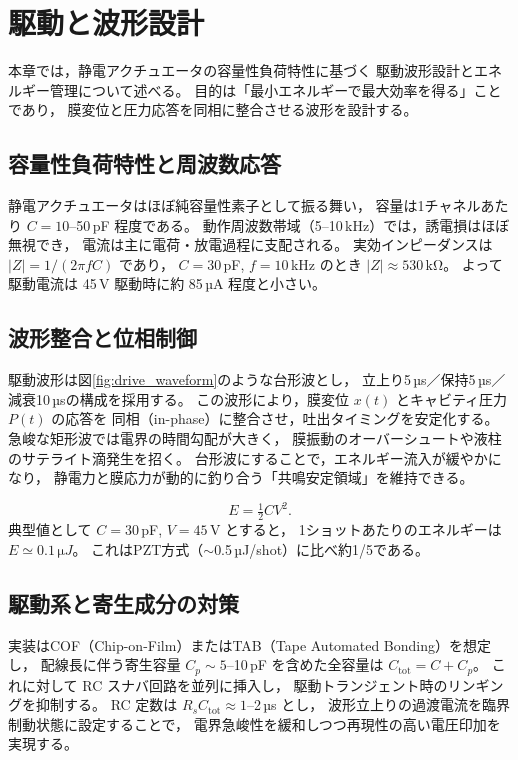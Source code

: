 \section{駆動と波形設計}

本章では，静電アクチュエータの容量性負荷特性に基づく
駆動波形設計とエネルギー管理について述べる。
目的は「最小エネルギーで最大効率を得る」ことであり，
膜変位と圧力応答を同相に整合させる波形を設計する。

\subsection{容量性負荷特性と周波数応答}
静電アクチュエータはほぼ純容量性素子として振る舞い，
容量は1チャネルあたり $C=10$--50\,pF 程度である。
動作周波数帯域（5--10\,kHz）では，誘電損はほぼ無視でき，
電流は主に電荷・放電過程に支配される。
実効インピーダンスは $|Z|=1/(2\pi f C)$ であり，
$C=30$\,pF, $f=10$\,kHz のとき $|Z|\approx530\,\mathrm{k\Omega}$。
よって駆動電流は 45\,V 駆動時に約 85\,µA 程度と小さい。

\subsection{波形整合と位相制御}
駆動波形は図\ref{fig:drive_waveform}のような台形波とし，
立上り5\,µs／保持5\,µs／減衰10\,µsの構成を採用する。
この波形により，膜変位 $x(t)$ とキャビティ圧力 $P(t)$ の応答を
同相（in-phase）に整合させ，吐出タイミングを安定化する。
急峻な矩形波では電界の時間勾配が大きく，
膜振動のオーバーシュートや液柱のサテライト滴発生を招く。
台形波にすることで，エネルギー流入が緩やかになり，
静電力と膜応力が動的に釣り合う「共鳴安定領域」を維持できる。

\begin{equation}
E = \tfrac{1}{2} C V^2.
\end{equation}
典型値として $C=30$\,pF, $V=45$\,V とすると，
1ショットあたりのエネルギーは $E\simeq0.1\,\si{\micro J}$。
これはPZT方式（$\sim$0.5\,µJ/shot）に比べ約1/5である。

\subsection{駆動系と寄生成分の対策}
実装はCOF（Chip-on-Film）またはTAB（Tape Automated Bonding）を想定し，
配線長に伴う寄生容量 $C_p\sim5$--10\,pF を含めた全容量は $C_\mathrm{tot}=C+C_p$。
これに対して RC スナバ回路を並列に挿入し，
駆動トランジェント時のリンギングを抑制する。
RC 定数は $R_sC_\mathrm{tot}\approx1$--2\,µs とし，
波形立上りの過渡電流を臨界制動状態に設定することで，
電界急峻性を緩和しつつ再現性の高い電圧印加を実現する。

